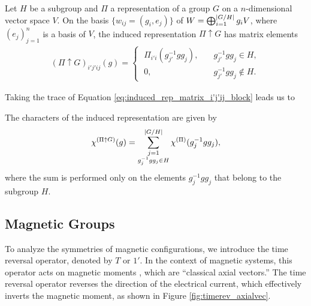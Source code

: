 \documentclass[12pt]{report}
\begin{document}
\begin{lemma} \label{lemma:induced_rep_matrix_i'j'ij_block}
Let $H$ be a subgroup and $\Pi$ a representation of a group $G$ on a $n$-dimensional vector space $V$. On the basis $\{w_{ij} = (g_i, e_j)\}$ of $W = \bigoplus_{i=1}^{\abs{G/H}} g_i V$, where $(e_j)_{j=1}^n$ is a basis of $V$, the induced representation $\Pi \uparrow G$ has matrix elements
\begin{align} \label{eq:induced_rep_matrix_i'j'ij_block}
(\Pi \uparrow G)_{i'j'ij}(g) =
\begin{cases}
\; \Pi_{i'i}(g_{j'}^{-1} g g_j), \quad & g_{j'}^{-1} g g_j \in H, \\
\; 0,  & g_{j'}^{-1} g g_j \notin H.
\end{cases}
\end{align}
\end{lemma}

Taking the trace of Equation \ref{eq:induced_rep_matrix_i'j'ij_block} leads us to

\begin{corollary} \label{coro:character_of_induced_rep}
The characters of the induced representation are given by
\begin{equation} \label{eq:character_induced_rep}
\chi^{(\Pi \uparrow G)}(g) = \sum_{\substack{j=1 \\ g_j^{-1} g g_j \in H}}^{\abs{G/H}} \chi^{(\Pi)} (g_j^{-1} g g_j),
\end{equation}
where the sum is performed only on the elements $g_j^{-1} g g_j$ that belong to the subgroup $H$.
\end{corollary}

\subsection{Magnetic Groups} \label{subsec:magnetic_groups}

To analyze the symmetries of magnetic configurations, we introduce the time reversal operator, denoted by \(T\) or \(1'\). In the context of magnetic systems, this operator acts on magnetic moments \cite{magnetic_structures2012}, which are ``classical axial vectors.'' The time reversal operator reverses the direction of the electrical current, which effectively inverts the magnetic moment, as shown in Figure \ref{fig:timerev_axialvec}.
\end{document}
